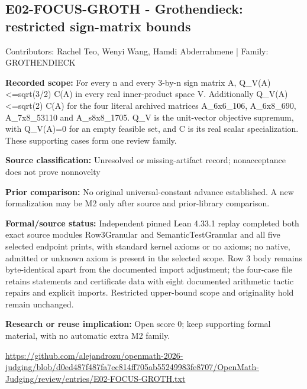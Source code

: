 \documentclass[11pt,a4paper]{article}
\begin{document}
\begin{samepage}
\subsection{E02-FOCUS-GROTH  -  Grothendieck: restricted sign-matrix bounds}
{\small Contributors: Rachel Teo, Wenyi Wang, Hamdi Abderrahmene | Family: GROTHENDIECK\par}

\textbf{Recorded scope:} For every n and every 3-by-n sign matrix A, Q\_V(A)<=sqrt(3/2) C(A) in every real inner-product space V. Additionally Q\_V(A)<=sqrt(2) C(A) for the four literal archived matrices A\_6x6\_106, A\_6x8\_690, A\_7x8\_53110 and A\_s8x8\_1705. Q\_V is the unit-vector objective supremum, with Q\_V(A)=0 for an empty feasible set, and C is its real scalar specialization. These supporting cases form one review family.

\end{samepage}
\textbf{Source classification:} Unresolved or missing-artifact record; nonacceptance does not prove nonnovelty

\textbf{Prior comparison:} No original universal-constant advance established. A new formalization may be M2 only after source and prior-library comparison.

\textbf{Formal/source status:} Independent pinned Lean 4.33.1 replay completed both exact source modules Row3Granular and SemanticTestGranular and all five selected endpoint prints, with standard kernel axioms or no axioms; no native, admitted or unknown axiom is present in the selected scope. Row 3 body remains byte-identical apart from the documented import adjustment; the four-case file retains statements and certificate data with eight documented arithmetic tactic repairs and explicit imports. Restricted upper-bound scope and originality hold remain unchanged.

\textbf{Research or reuse implication:} Open score 0; keep supporting formal material, with no automatic extra M2 family.

{\small \url{https://github.com/alejandrozu/openmath-2026-judging/blob/d0ed487f487fa7ec814ff705ab55249983fe8707/OpenMath-Judging/review/entries/E02-FOCUS-GROTH.txt}\par}
\end{document}
